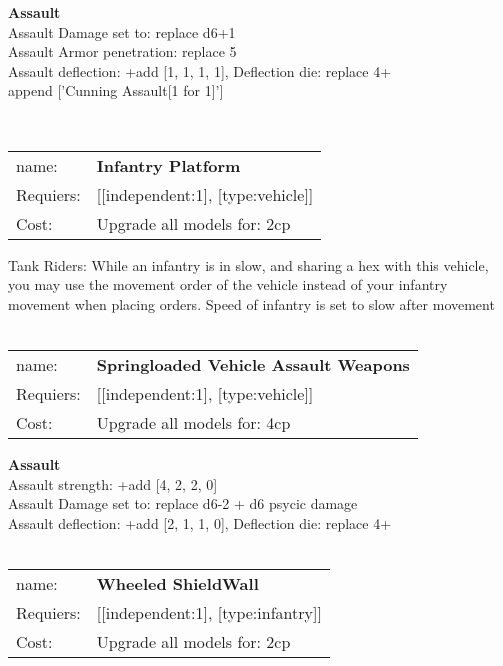 {\bf Assault} \ \\
Assault Damage set to: replace d6+1
\\ 
Assault Armor penetration: replace 5 
\\ 
Assault deflection: +add [1, 1, 1, 1], Deflection die: replace 4+
\\ 

append ['Cunning Assault[1 for 1]']


\ \\
\begin{tabular}{ll}
name: & {\bf Infantry Platform } \\
Requiers: & [[independent:1], [type:vehicle]] \\
Cost: & Upgrade all models for: 2cp \\
\end{tabular}

Tank Riders: While an infantry is in slow, and sharing a hex with this vehicle, you may use the movement order of the vehicle instead of your infantry movement when placing orders. Speed of infantry is set to slow after movement\\ 









\ \\
\begin{tabular}{ll}
name: & {\bf Springloaded Vehicle Assault Weapons } \\
Requiers: & [[independent:1], [type:vehicle]] \\
Cost: & Upgrade all models for: 4cp \\
\end{tabular}





{\bf Assault} \ \\
Assault strength: +add [4, 2, 2, 0] 
\\ 
Assault Damage set to: replace d6-2 + d6 psycic damage
\\ 
Assault deflection: +add [2, 1, 1, 0], Deflection die: replace 4+
\\ 




\ \\
\begin{tabular}{ll}
name: & {\bf Wheeled ShieldWall } \\
Requiers: & [[independent:1], [type:infantry]] \\
Cost: & Upgrade all models for: 2cp \\
\end{tabular}

